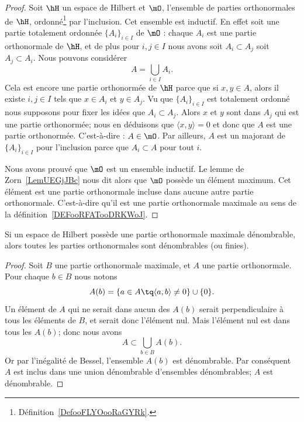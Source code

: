 \begin{proof}
	Soit \( \hH\) un espace de Hilbert et \( \mO\), l'ensemble de parties orthonormales de \( \hH\), ordonné\footnote{Définition~\ref{DefooFLYOooRaGYRk}.} par l'inclusion. Cet ensemble est inductif. En effet soit une partie totalement ordonnée \( \{ A_i \}_{i\in I}\) de \( \mO\) : chaque \( A_i\) est une partie orthonormale de \( \hH\), et de plus pour \( i,j\in I\) nous avons soit \( A_i\subset A_j\) soit \( A_j\subset A_i\). Nous pouvons considérer
	\begin{equation}
		A=\bigcup_{i\in I}A_i.
	\end{equation}
	Cela est encore une partie orthonormée de \( \hH\) parce que si \( x,y\in A\), alors il existe \( i,j\in I\) tels que \( x\in A_i\) et \( y\in A_j\). Vu que \( \{ A_i \}_{i\in I}\) est totalement ordonné nous supposons pour fixer les idées que \( A_i\subset A_j\). Alors \(x \) et \( y\) sont dans \( A_j\) qui est une partie orthonormée; nous en déduisons que \( \langle x, y\rangle =0\) et donc que \( A\) est une partie orthonormée. C'est-à-dire : \( A\in \mO\). Par ailleurs, \( A\) est un majorant de \( \{ A_i \}_{i\in I}\) pour l'inclusion parce que \( A_i\subset A\) pour tout \( i\).

	Nous avons prouvé que \( \mO\) est un ensemble inductif. Le lemme de Zorn~\ref{LemUEGjJBc} nous dit alors que \( \mO\) possède un élément maximum. Cet élément est une partie orthonormale incluse dans aucune autre partie orthonormale. C'est-à-dire qu'il est une partie orthonormale maximale au sens de la définition~\ref{DEFooRFATooDRKWoJ}.
\end{proof}

\begin{proposition}      \label{PROPooENTIooIplRAS}
	Si un espace de Hilbert possède une partie orthonormale maximale dénombrable, alors toutes les parties orthonormales sont dénombrables (ou finies).
\end{proposition}

\begin{proof}
	Soit \( B\) une partie orthonormale maximale, et \( A\) une partie orthonormale. Pour chaque \( b\in B\) nous notons
	\begin{equation}
		A(b)=\{ a\in A\tq \langle a, b\rangle \neq 0 \}\cup\{ 0 \}.
	\end{equation}
	Un élément de \( A\) qui ne serait dans aucun des \( A(b)\) serait perpendiculaire à tous les éléments de \( B\), et serait donc l'élément nul. Mais l'élément nul est dans tous les \( A(b)\); donc nous avons
	\begin{equation}
		A\subset\bigcup_{b\in B}A(b).
	\end{equation}
	Or par l'inégalité de Bessel, l'ensemble \( A(b)\) est dénombrable. Par conséquent \( A\) est inclus dans une union dénombrable d'ensembles dénombrables; \( A\) est dénombrable.
\end{proof}


